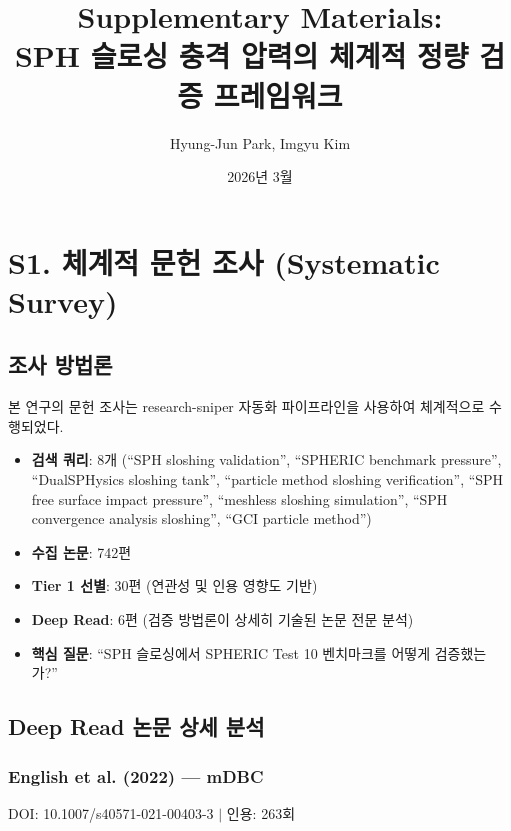\documentclass[a4paper,11pt]{article}
\title{Supplementary Materials:\\
SPH 슬로싱 충격 압력의 체계적 정량 검증 프레임워크}
\author{Hyung-Jun Park, Imgyu Kim}
\date{2026년 3월}
\begin{document}
\maketitle
\tableofcontents
\newpage


\section{S1. 체계적 문헌 조사 (Systematic Survey)} \label{sec:s1}

\subsection{조사 방법론}

본 연구의 문헌 조사는 research-sniper 자동화 파이프라인을 사용하여 체계적으로 수행되었다.

\begin{itemize}
    \item \textbf{검색 쿼리}: 8개 (``SPH sloshing validation'',
          ``SPHERIC benchmark pressure'',
          ``DualSPHysics sloshing tank'',
          ``particle method sloshing verification'',
          ``SPH free surface impact pressure'',
          ``meshless sloshing simulation'',
          ``SPH convergence analysis sloshing'',
          ``GCI particle method'')
    \item \textbf{수집 논문}: 742편
    \item \textbf{Tier 1 선별}: 30편 (연관성 및 인용 영향도 기반)
    \item \textbf{Deep Read}: 6편 (검증 방법론이 상세히 기술된 논문 전문 분석)
    \item \textbf{핵심 질문}: ``SPH 슬로싱에서 SPHERIC Test 10 벤치마크를 어떻게 검증했는가?''
\end{itemize}


\subsection{Deep Read 논문 상세 분석}

\subsubsection{English et al. (2022) --- mDBC}

DOI: 10.1007/s40571-021-00403-3 $|$ 인용: 263회
\end{document}
